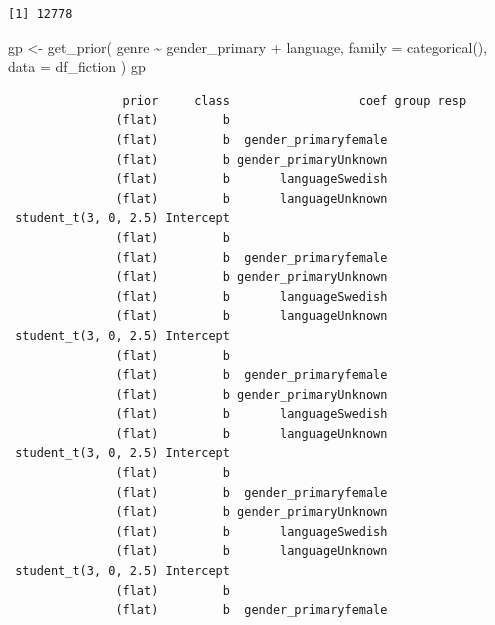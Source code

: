 \documentclass[
  letterpaper,
  DIV=11,
  numbers=noendperiod]{scrartcl}
\newenvironment{Shaded}{\begin{snugshade}}{\end{snugshade}}
\newcommand{\AttributeTok}[1]{\textcolor[rgb]{0.40,0.45,0.13}{#1}}
\newcommand{\FunctionTok}[1]{\textcolor[rgb]{0.28,0.35,0.67}{#1}}
\newcommand{\NormalTok}[1]{\textcolor[rgb]{0.00,0.23,0.31}{#1}}
\newcommand{\OtherTok}[1]{\textcolor[rgb]{0.00,0.23,0.31}{#1}}
\newcommand{\SpecialCharTok}[1]{\textcolor[rgb]{0.37,0.37,0.37}{#1}}
\begin{document}
\begin{verbatim}
[1] 12778
\end{verbatim}

\begin{Shaded}
\begin{Highlighting}[]
\NormalTok{gp }\OtherTok{\textless{}{-}} \FunctionTok{get\_prior}\NormalTok{(}
\NormalTok{    genre }\SpecialCharTok{\textasciitilde{}}\NormalTok{ gender\_primary }\SpecialCharTok{+}\NormalTok{ language,}
     \AttributeTok{family =} \FunctionTok{categorical}\NormalTok{(),}
     \AttributeTok{data =}\NormalTok{ df\_fiction}
\NormalTok{ )}
\NormalTok{gp}
\end{Highlighting}
\end{Shaded}

\begin{verbatim}
                prior     class                  coef group resp
               (flat)         b                                 
               (flat)         b  gender_primaryfemale           
               (flat)         b gender_primaryUnknown           
               (flat)         b       languageSwedish           
               (flat)         b       languageUnknown           
 student_t(3, 0, 2.5) Intercept                                 
               (flat)         b                                 
               (flat)         b  gender_primaryfemale           
               (flat)         b gender_primaryUnknown           
               (flat)         b       languageSwedish           
               (flat)         b       languageUnknown           
 student_t(3, 0, 2.5) Intercept                                 
               (flat)         b                                 
               (flat)         b  gender_primaryfemale           
               (flat)         b gender_primaryUnknown           
               (flat)         b       languageSwedish           
               (flat)         b       languageUnknown           
 student_t(3, 0, 2.5) Intercept                                 
               (flat)         b                                 
               (flat)         b  gender_primaryfemale           
               (flat)         b gender_primaryUnknown           
               (flat)         b       languageSwedish           
               (flat)         b       languageUnknown           
 student_t(3, 0, 2.5) Intercept                                 
               (flat)         b                                 
               (flat)         b  gender_primaryfemale           

\end{verbatim}
\end{document}
